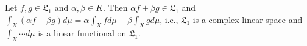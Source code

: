 Let $f, g \in \mathfrak{L}_1$ and $\alpha, \beta \in K$. Then $\alpha f + \beta g \in \mathfrak{L}_1$ and $\int_X (\alpha f + \beta g) d\mu = \alpha \int_X f d\mu + \beta \int_X g d\mu$, i.e., $\mathfrak{L}_1$ is a complex linear space and $\int_X \cdots d\mu$ is a linear functional on $\mathfrak{L}_1$.
